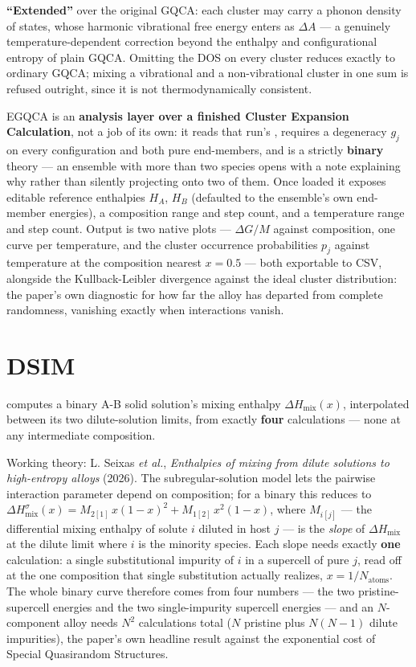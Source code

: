 \textbf{``Extended''} over the original GQCA: each cluster may carry a
phonon density of states, whose harmonic vibrational free energy enters as
$\Delta A$ --- a genuinely temperature-dependent correction beyond the
enthalpy and configurational entropy of plain GQCA. Omitting the DOS on
every cluster reduces exactly to ordinary GQCA; mixing a vibrational and a
non-vibrational cluster in one sum is refused outright, since it is not
thermodynamically consistent.

EGQCA is an \textbf{analysis layer over a finished Cluster Expansion
Calculation}, not a job of its own: it reads that run's
, requires a degeneracy $g_j$ on every
configuration and both pure end-members, and is a strictly \textbf{binary}
theory --- an ensemble with more than two species opens with a note
explaining why rather than silently projecting onto two of them. Once
loaded it exposes editable reference enthalpies $H_A$, $H_B$ (defaulted to
the ensemble's own end-member energies), a composition range and step
count, and a temperature range and step count. Output is two native plots
--- $\Delta G/M$ against composition, one curve per temperature, and the
cluster occurrence probabilities $p_j$ against temperature at the
composition nearest $x = 0.5$ --- both exportable to CSV, alongside the
Kullback-Leibler divergence against the ideal cluster distribution: the
paper's own diagnostic for how far the alloy has departed from complete
randomness, vanishing exactly when interactions vanish.

\section{DSIM}
\label{sec:dsim}

\menusep{}\menusep{} computes a binary A-B solid solution's mixing
enthalpy $\Delta H_\text{mix}(x)$, interpolated between its two
dilute-solution limits, from exactly \textbf{four} calculations --- none at
any intermediate composition.

Working theory: L. Seixas \emph{et al.}, \emph{Enthalpies of mixing from
dilute solutions to high-entropy alloys} (2026). The subregular-solution
model lets the pairwise interaction parameter depend on composition; for a
binary this reduces to
$\Delta H_\text{mix}^\sigma(x) = M_{2[1]}\,x(1-x)^2 + M_{1[2]}\,x^2(1-x)$,
where $M_{i[j]}$ --- the differential mixing enthalpy of solute $i$ diluted
in host $j$ --- is the \emph{slope} of $\Delta H_\text{mix}$ at the dilute
limit where $i$ is the minority species. Each slope needs exactly
\textbf{one} calculation: a single substitutional impurity of $i$ in a
supercell of pure $j$, read off at the one composition that single
substitution actually realizes, $x = 1/N_\text{atoms}$. The whole binary
curve therefore comes from four numbers --- the two pristine-supercell
energies and the two single-impurity supercell energies --- and an
$N$-component alloy needs $N^2$ calculations total ($N$ pristine plus
$N(N-1)$ dilute impurities), the paper's own headline result against the
exponential cost of Special Quasirandom Structures.

